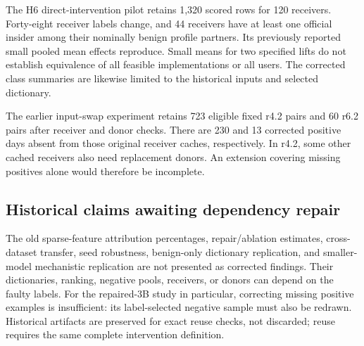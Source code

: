 The H6 direct-intervention pilot retains 1,320 scored rows for 120 receivers.
Forty-eight receiver labels change, and 44 receivers have at least one official
insider among their nominally benign profile partners. Its previously reported
small pooled mean effects reproduce. Small means for two specified lifts do not
establish equivalence of all feasible implementations or all users. The
corrected class summaries are likewise limited to the historical inputs and
selected dictionary.

The earlier input-swap experiment retains 723 eligible fixed r4.2 pairs and 60
r6.2 pairs after receiver and donor checks. There are 230 and 13 corrected
positive days absent from those original receiver caches, respectively. In
r4.2, some other cached receivers also need replacement donors. An extension
covering missing positives alone would therefore be incomplete.

\subsection{Historical claims awaiting dependency repair}
The old sparse-feature attribution percentages, repair/ablation estimates,
cross-dataset transfer, seed robustness, benign-only dictionary replication,
and smaller-model mechanistic replication are not presented as corrected
findings. Their dictionaries, ranking, negative pools, receivers, or donors can
depend on the faulty labels. For the repaired-3B study in particular, correcting
missing positive examples is insufficient: its label-selected negative sample
must also be redrawn. Historical artifacts are preserved for exact reuse checks,
not discarded; reuse requires the same complete intervention definition.
